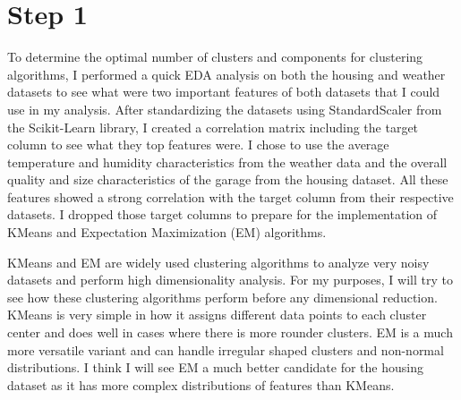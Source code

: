 \documentclass[conference]{IEEEtran}
\begin{document}
\section{Step 1}
\par To determine the optimal number of clusters and components for clustering algorithms, I performed a quick EDA analysis on both the housing and weather datasets to see what were two important features of both datasets that I could use in my analysis. After standardizing the datasets using StandardScaler from the Scikit-Learn library, I created a correlation matrix including the target column to see what they top features were. I chose to use the average temperature and humidity characteristics from the weather data and the overall quality and size characteristics of the garage from the housing dataset. All these features showed a strong correlation with the target column from their respective datasets. I dropped those target columns to prepare for the implementation of KMeans and Expectation Maximization (EM) algorithms.
\par KMeans and EM are widely used clustering algorithms to analyze very noisy datasets and perform high dimensionality analysis. For my purposes, I will try to see how these clustering algorithms perform before any dimensional reduction. KMeans is very simple in how it assigns different data points to each cluster center and does well in cases where there is more rounder clusters. EM is a much more versatile variant and can handle irregular shaped clusters and non-normal distributions. I think I will see EM a much better candidate for the housing dataset as it has more complex distributions of features than KMeans.
\end{document}
